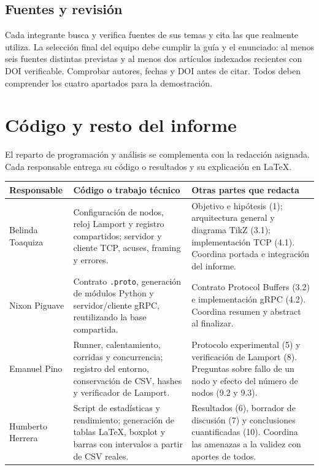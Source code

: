 \subsection*{Fuentes y revisión}
Cada integrante busca y verifica fuentes de sus temas y cita las que realmente
utiliza. La selección final del equipo debe cumplir la guía y el enunciado:
al menos seis fuentes distintas previstas y al menos dos artículos indexados
recientes con DOI verificable. Comprobar autores, fechas y DOI antes de citar.
Todos deben comprender los cuatro apartados para la demostración.

\clearpage
\section*{Código y resto del informe}
El reparto de programación y análisis se complementa con la redacción asignada.
Cada responsable entrega su código o resultados y su explicación en LaTeX.

\begingroup
\small
\renewcommand{\arraystretch}{1.3}
\noindent\begin{tabular}{@{}>{\raggedright\arraybackslash}p{2.8cm}>{\raggedright\arraybackslash}p{6.0cm}>{\raggedright\arraybackslash}p{6.2cm}@{}}
\toprule
Responsable & Código o trabajo técnico & Otras partes que redacta \\
\midrule
Belinda Toaquiza & Configuración de nodos, reloj Lamport y registro compartidos;
servidor y cliente TCP, acuses, framing y errores.
& Objetivo e hipótesis (1); arquitectura general y diagrama TikZ (3.1);
implementación TCP (4.1). Coordina portada e integración del informe. \\
Nixon Piguave & Contrato \texttt{.proto}, generación de módulos Python y
servidor/cliente gRPC, reutilizando la base compartida.
& Contrato Protocol Buffers (3.2) e implementación gRPC (4.2).
Coordina resumen y abstract al finalizar. \\
Emanuel Pino & Runner, calentamiento, corridas y concurrencia; registro del
entorno, conservación de CSV, hashes y verificador de Lamport.
& Protocolo experimental (5) y verificación de Lamport (8).
Preguntas sobre fallo de un nodo y efecto del número de nodos (9.2 y 9.3). \\
Humberto Herrera & Script de estadísticas y rendimiento; generación de tablas
LaTeX, boxplot y barras con intervalos a partir de CSV reales.
& Resultados (6), borrador de discusión (7) y conclusiones cuantificadas (10).
Coordina las amenazas a la validez con aportes de todos. \\
\bottomrule
\end{tabular}
\endgroup


